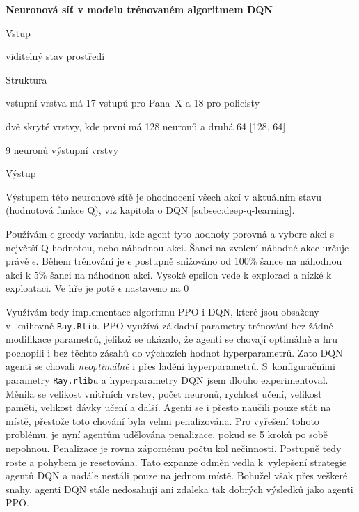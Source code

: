     \textbf{Neuronová síť v modelu trénovaném algoritmem DQN}
    \begin{myitemize}
      \item Vstup
        \begin{myitemize}
          \item viditelný stav prostředí
        \end{myitemize}
      \item Struktura
        \begin{myitemize}
          \item vstupní vrstva má 17 vstupů pro Pana~X a 18 pro policisty
          \item dvě skryté vrstvy, kde první má 128 neuronů a druhá 64 [128, 64]
          \item 9 neuronů výstupní vrstvy
        \end{myitemize}
      \item Výstup
        \begin{myitemize}
          \item Výstupem této neuronové sítě je ohodnocení všech akcí v aktuálním stavu (hodnotová funkce Q), viz kapitola o DQN \ref{subsec:deep-q-learning}.
          \item Používám $\epsilon$-greedy variantu, kde agent tyto hodnoty porovná a vybere akci s největší Q hodnotou, nebo náhodnou akci.
          Šanci na zvolení náhodné akce určuje právě $\epsilon$. Během trénování je $\epsilon$ postupně snižováno od 100\% šance na náhodnou akci k 5\% šanci na náhodnou akci.
          Vysoké epsilon vede k exploraci a nízké k exploataci. Ve hře je poté $\epsilon$ nastaveno na 0%
        \end{myitemize}
    \end{myitemize}

  \bigskip

Využívám tedy implementace algoritmu PPO i DQN, které jsou obsaženy v~knihovně \texttt{Ray.Rlib}.
PPO využívá základní parametry trénování bez žádné modifikace parametrů, jelikož se ukázalo, že agenti se chovají optimálně a hru pochopili i bez těchto zásahů do výchozích hodnot hyperparametrů.
Zato DQN agenti se chovali \emph{neoptimálně} i přes ladění hyperparametrů.
S~konfiguračními parametry \texttt{Ray.rlib}u a hyperparametry DQN jsem dlouho experimentoval.
Měnila se velikost vnitřních vrstev, počet neuronů, rychlost učení, velikost paměti, velikost dávky učení a další.
Agenti se i přesto naučili pouze stát na místě, přestože toto chování byla velmi penalizována.
Pro vyřešení tohoto problému, je nyní agentům udělována penalizace, pokud se 5 kroků po sobě nepohnou.
Penalizace je rovna zápornému počtu kol nečinnosti.
Postupně tedy roste a pohybem je resetována.
Tato expanze odměn vedla k~vylepšení strategie agentů DQN a nadále nestáli pouze na jednom místě.
Bohužel však přes veškeré snahy, agenti DQN stále nedosahují ani zdaleka tak dobrých výsledků jako agenti PPO\@.

